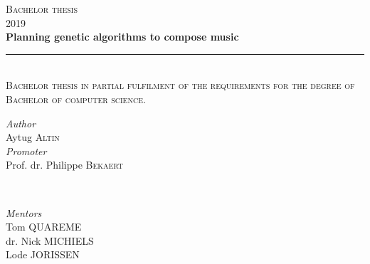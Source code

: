 \documentclass[a4paper]{article}
\begin{document}
\begin{titlepage} %
	\newcommand{\HRule}{\rule{\linewidth}{0.5mm}} %
	
	\center %
	
	
	\textsc{\LARGE Bachelor thesis}\\[0.7cm] %
	
	\textsc{\Large 2019}\\[1.5cm] %
	
	
	
	
	{\huge\bfseries Planning genetic algorithms to compose music}\\[0.2cm] %
	
	\HRule\\[0.6cm]
	
	\textsc{\large Bachelor thesis in partial fulfilment of the requirements for the degree of Bachelor of computer science.}\\[1.5cm] 
	
	
	\begin{minipage}{0.5\textwidth}
		\begin{flushleft}
			\large
			\textit{Author}\\
			Aytug \textsc{Altin}\\ 
			
			\textit{Promoter}\\
			Prof. dr. Philippe  \textsc{Bekaert}\\ 
		\end{flushleft}
	\end{minipage}
	~
	\begin{minipage}{0.4\textwidth}
		\begin{flushright}
			\large
			
			\textit{Mentors}\\
			Tom   \textsc{QUAREME}\\
			dr. Nick   \textsc{MICHIELS}\\
			Lode  \textsc{JORISSEN} \\
		\end{flushright}
	\end{minipage}
	

\end{titlepage}
\end{document}
